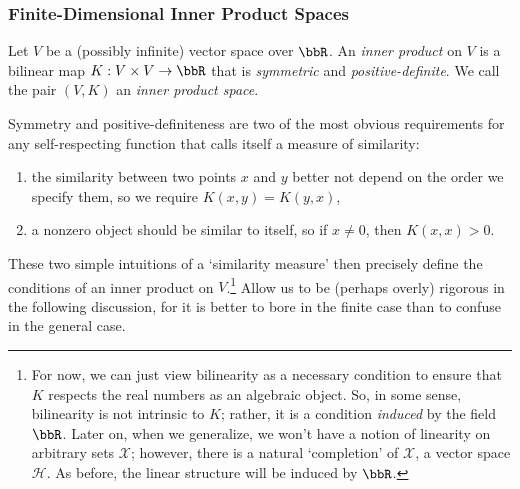 \documentclass[twoside,11pt]{homework}
\begin{document}
\begin{multicols}{2}
\subsubsection{Finite-Dimensional Inner Product Spaces}
\begin{definition}\label{IP}
  Let $V$ be a (possibly infinite) vector space over $\bbR$. An \emph{inner product}
  on $V$ is a bilinear map $K : V \times V \to \bbR$
  that is \emph{symmetric} and \emph{positive-definite}. We call the pair $(V,K)$ an
  \emph{inner product space}.
\end{definition}
Symmetry and positive-definiteness are two of the most obvious requirements for any
self-respecting function that calls itself a measure of similarity:
\begin{enumerate}
\item  the similarity between two points $x$ and $y$ better not depend on the order
  we specify them, so we require $K(x,y) = K(y,x)$,
\item a nonzero object should be similar to itself, so if $x \ne 0$, then $K(x,x) > 0$.
\end{enumerate}
These two simple intuitions of a `similarity measure' then precisely define the
conditions of an inner product on $V$.\footnote{For now, we can just view bilinearity
  as a necessary condition to ensure that $K$ respects the real numbers as an algebraic
  object. So, in some sense, bilinearity is not intrinsic to $K$; rather, it is a
  condition \emph{induced} by the field $\bbR$. Later on, when we generalize, we won't
  have a notion of linearity on arbitrary sets $\mathcal{X}$; however, there is a
  natural `completion' of $\mathcal{X}$, a vector space $\mathcal{H}$. As before, the
  linear structure will be induced by $\bbR$.} Allow us to be (perhaps overly) rigorous
in the following discussion, for it is better to bore in the finite case than to confuse
in the general case.


\end{multicols}
\end{document}
